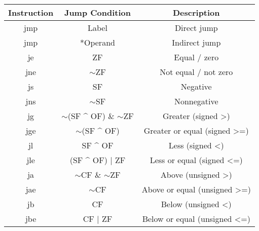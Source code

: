 \begin{center}
	\begin{tabular}{|c|c|c|}
		\hline
		\textbf{Instruction} & \textbf{Jump Condition}                 & \textbf{Description}         \\ \hline
		jmp                  & Label                                   & Direct jump                  \\ \hline
		jmp                  & *Operand                                & Indirect jump                \\ \hline
		je                   & ZF                                      & Equal / zero                 \\ \hline
		jne                  & $\sim$ZF                                & Not equal / not zero         \\ \hline
		js                   & SF                                      & Negative                     \\ \hline
		jns                  & $\sim$SF                                & Nonnegative                  \\ \hline
        jg                   & $\sim$(SF \^{} OF) $\&$ $\sim$ZF & Greater (signed >)           \\ \hline
        jge                  & $\sim$(SF \^{} OF)                  & Greater or equal (signed >=) \\ \hline
        jl                   & SF \^{} OF                          & Less (signed <)              \\ \hline
        jle                  & (SF \^{}  OF) $|$ ZF              & Less or equal (signed <=)    \\ \hline
        ja                   & $\sim$CF $\&$ $\sim$ZF               & Above (unsigned >)           \\ \hline
		jae                  & $\sim$CF                                & Above or equal (unsigned >=) \\ \hline
		jb                   & CF                                      & Below (unsigned <)           \\ \hline
		jbe                  & CF $|$ ZF                            & Below or equal (unsigned <=) \\ \hline
	\end{tabular}
\end{center}
